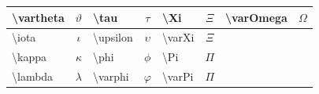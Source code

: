\begin{center}
\begin{tabular}{|l|c||l|c|l|c||l|c|}
\textbackslash vartheta     & $\vartheta$       & \textbackslash tau          & $\tau$      & \textbackslash Xi           & $\Xi$           & \textbackslash varOmega     & $\varOmega$     \\ \hline
\textbackslash iota         & $\iota$           & \textbackslash upsilon      & $\upsilon$  & \textbackslash varXi        & $\varXi$        &                             &                 \\ \hline
\textbackslash kappa        & $\kappa$          & \textbackslash phi          & $\phi$      & \textbackslash Pi           & $\Pi$           &                             &                 \\ \hline
\textbackslash lambda       & $\lambda$         & \textbackslash varphi       & $\varphi$   & \textbackslash varPi        & $\varPi$        &                             &                 \\ \hline
\end{tabular}
\end{center}

